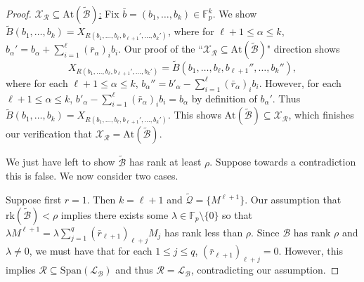 \documentclass[12pt,oneside,british,a4wide]{amsart}
\numberwithin{equation}{section}
\theoremstyle{definition}
\def\F{\mathbb{F}}
\newcommand{\bbar}{\bar{b}}
\newcommand{\rbar}{\bar{r}}
\newcommand{\calL}{\mathcal{L}}
\newcommand{\calB}{\mathcal{B}}
\newcommand{\calQ}{\mathcal{Q}}
\newcommand{\calR}{\mathcal{R}}
\newcommand{\calX}{\mathcal{X}}
\newcommand{\Span}{{\mathrm{Span}}}
\newcommand{\At}{{\mathrm{At}}}
\newcommand{\rk}{{\mathrm{rk}}}
\begin{document}
\begin{proof}
 \underline{$\calX_{\calR}\subseteq \At(\tilde{\calB})$:} Fix   $\bbar=(b_1,\ldots, b_k)\in \F_p^k$. We show  $\tilde{B}(b_1,\ldots, b_k)=X_{R(b_1,\ldots, b_{\ell},b_{\ell+1}',\ldots, b_k')}$,   where for $\ell+1\leq \alpha\leq k$, $b_{\alpha}'=b_{\alpha}+\sum_{i=1}^{\ell}(\rbar_{\alpha})_ib_i$.  Our proof of the ``$\calX_{\calR}\subseteq \At(\tilde{\calB})$" direction shows  
 $$
 X_{R(b_1,\ldots, b_{\ell},b_{\ell+1}',\ldots, b_k')}=\tilde{B}(b_1,\ldots, b_{\ell},b_{\ell+1}'',\ldots, b_k''),
 $$
  where for each $\ell+1\leq \alpha\leq k$, $b_{\alpha}''=b'_{\alpha}-\sum_{i=1}^{\ell}(\rbar_{\alpha})_ib_i$.   However, for each $\ell+1\leq \alpha\leq k$, $b'_{\alpha}-\sum_{i=1}^{\ell}(\rbar_{\alpha})_ib_i=b_{\alpha}$ by definition of $b_{\alpha}'$.  Thus  $\tilde{B}(b_1,\ldots, b_k)=X_{R(b_1,\ldots, b_{\ell},b_{\ell+1}',\ldots, b_k')}$. This shows $\At(\tilde{\calB})\subseteq \calX_{\calR}$, which finishes our verification that $\calX_{\calR}=\At(\tilde{\calB})$.
  
We just have left to show $\tilde{\calB}$ has rank at least $\rho$. Suppose towards a contradiction this is false.  We now consider two cases.

Suppose first $r=1$. Then $k=\ell+1$ and $\tilde{\calQ}=\{M^{\ell+1}\}$. Our assumption that $\rk(\tilde{\calB})<\rho$ implies there exists some $\lambda\in \F_p\setminus \{ 0\}$ so that  $\lambda M^{\ell+1}=\lambda \sum_{j=1}^q (\rbar_{\ell+1})_{\ell+j}M_j$  has rank less than $\rho$. Since $\calB$ has rank $\rho$ and $\lambda\neq 0$, we must have that for each $1\leq j\leq q$, $(\rbar_{\ell+1})_{\ell+j}=0$. However, this implies $\calR\subseteq \Span(\calL_{\calB})$ and thus $\calR=\calL_{\calB}$, contradicting our assumption.   


\end{proof}
\end{document}
